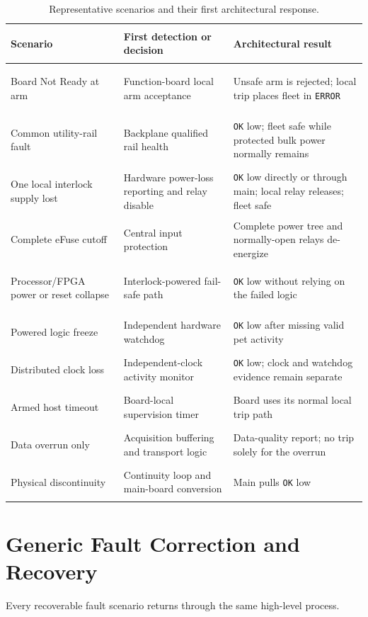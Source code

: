 \begin{table}[htbp]
\centering
\small
\begin{tabularx}{\textwidth}{@{}>{\bfseries\raggedright\arraybackslash}p{}>{\raggedright\arraybackslash}p{}>{\raggedright\arraybackslash}X@{}}
\toprule
Scenario & First detection or decision & Architectural result \\
\midrule
Board Not Ready at arm & Function-board local arm acceptance & Unsafe arm is rejected; local trip places fleet in \texttt{ERROR} \\
Common utility-rail fault & Backplane qualified rail health & \texttt{OK} low; fleet safe while protected bulk power normally remains \\
One local interlock supply lost & Hardware power-loss reporting and relay disable & \texttt{OK} low directly or through main; local relay releases; fleet safe \\
Complete eFuse cutoff & Central input protection & Complete power tree and normally-open relays de-energize \\
Processor/FPGA power or reset collapse & Interlock-powered fail-safe path & \texttt{OK} low without relying on the failed logic \\
Powered logic freeze & Independent hardware watchdog & \texttt{OK} low after missing valid pet activity \\
Distributed clock loss & Independent-clock activity monitor & \texttt{OK} low; clock and watchdog evidence remain separate \\
Armed host timeout & Board-local supervision timer & Board uses its normal local trip path \\
Data overrun only & Acquisition buffering and transport logic & Data-quality report; no trip solely for the overrun \\
Physical discontinuity & Continuity loop and main-board conversion & Main pulls \texttt{OK} low \\
\bottomrule
\end{tabularx}
\caption{Representative scenarios and their first architectural response.}
\label{tab:scenario-summary}
\end{table}

\section{Generic Fault Correction and Recovery}

Every recoverable fault scenario returns through the same high-level process.

